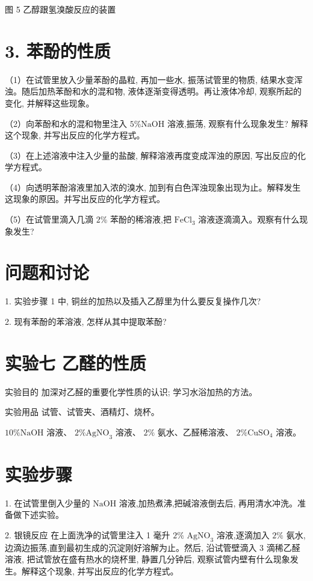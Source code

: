 \documentclass[10pt]{article}
\begin{document}
图 5 乙醇跟氢溴酸反应的装置

\section*{3. 苯酚的性质}

（1）在试管里放入少量苯酚的晶粒, 再加一些水, 振荡试管里的物质, 结果水变浑浊。随后加热苯酚和水的混和物, 液体逐渐变得透明。再让液体冷却, 观察所起的变化, 并解释这些现象。

（2）向苯酚和水的混和物里注入 \(5\% \mathrm{{NaOH}}\) 溶液,振荡, 观察有什么现象发生? 解释这个现象, 并写出反应的化学方程式。

（3）在上述溶液中注入少量的盐酸, 解释溶液再度变成浑浊的原因, 写出反应的化学方程式。

（4）向透明苯酚溶液里加入浓的溴水, 加到有白色浑浊现象出现为止。解释发生这现象的原因。并写出反应的化学方程式。

（5）在试管里滴入几滴 \(2\%\) 苯酚的稀溶液,把 \({\mathrm{{FeCl}}}_{3}\) 溶液逐滴滴入。观察有什么现象发生?

\section*{问题和讨论}

1. 实验步骤 1 中, 铜丝的加热以及插入乙醇里为什么要反复操作几次?

2. 现有苯酚的苯溶液, 怎样从其中提取苯酚?

\section*{实验七 乙醛的性质}

实验目的 加深对乙醛的重要化学性质的认识; 学习水浴加热的方法。

实验用品 试管、试管夹、酒精灯、烧杯。

\({10}\% \mathrm{{NaOH}}\) 溶液、 \(2\% {\mathrm{{AgNO}}}_{3}\) 溶液、 \(2\%\) 氨水、乙醛稀溶液、 \(2\% {\mathrm{{CuSO}}}_{4}\) 溶液。

\section*{实验步骤}

1. 在试管里倒入少量的 \(\mathrm{{NaOH}}\) 溶液,加热煮沸,把碱溶液倒去后, 再用清水冲洗。准备做下述实验。

2. 银镜反应 在上面洗净的试管里注入 1 毫升 \(2\%\) \({\mathrm{{AgNO}}}_{3}\) 溶液,逐滴加入 \(2\%\) 氨水,边滴边振荡,直到最初生成的沉淀刚好溶解为止。然后, 沿试管壁滴入 3 滴稀乙醛溶液, 把试管放在盛有热水的烧杯里, 静置几分钟后, 观察试管内壁有什么现象发生。解释这个现象, 并写出反应的化学方程式。
\end{document}

